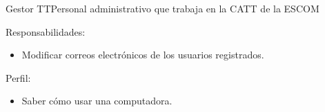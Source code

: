 \begin{actor}{Gestor TT}{Personal administrativo que trabaja en la CATT de la ESCOM} 
	\item[Responsabilidades:] \hspace{1pt}
	\begin{itemize}
		\item Modificar correos electrónicos de los usuarios registrados.
	\end{itemize}
	\item[Perfil:]
	\begin{itemize}
		\item Saber cómo usar una computadora.
	\end{itemize}
\end{actor}